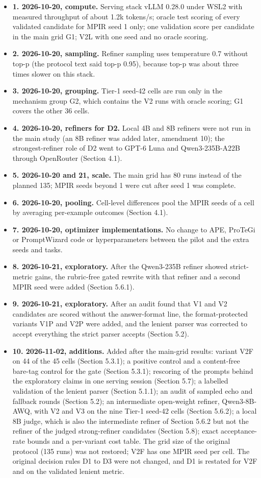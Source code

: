 \documentclass{ieeeaccess}
\begin{document}
\begin{itemize}
\item \textbf{1. 2026-10-20, compute.} Serving stack vLLM 0.28.0 under WSL2 with measured throughput of about 1.2k tokens/s; oracle test scoring of every validated candidate for MPIR seed 1 only; one validation score per candidate in the main grid G1; V2L with one seed and no oracle scoring.
\item \textbf{2. 2026-10-20, sampling.} Refiner sampling uses temperature 0.7 without top-p (the protocol text said top-p 0.95), because top-p was about three times slower on this stack.
\item \textbf{3. 2026-10-20, grouping.} Tier-1 seed-42 cells are run only in the mechanism group G2, which contains the V2 runs with oracle scoring; G1 covers the other 36 cells.
\item \textbf{4. 2026-10-20, refiners for D2.} Local 4B and 8B refiners were not run in the main study (an 8B refiner was added later, amendment 10); the strongest-refiner role of D2 went to GPT-6 Luna and Qwen3-235B-A22B through OpenRouter (Section 4.1).
\item \textbf{5. 2026-10-20 and 21, scale.} The main grid has 80 runs instead of the planned 135; MPIR seeds beyond 1 were cut after seed 1 was complete.
\item \textbf{6. 2026-10-20, pooling.} Cell-level differences pool the MPIR seeds of a cell by averaging per-example outcomes (Section 4.1).
\item \textbf{7. 2026-10-20, optimizer implementations.} No change to APE, ProTeGi or PromptWizard code or hyperparameters between the pilot and the extra seeds and tasks.
\item \textbf{8. 2026-10-21, exploratory.} After the Qwen3-235B refiner showed strict-metric gains, the rubric-free gated rewrite with that refiner and a second MPIR seed were added (Section 5.6.1).
\item \textbf{9. 2026-10-21, exploratory.} After an audit found that V1 and V2 candidates are scored without the answer-format line, the format-protected variants V1P and V2P were added, and the lenient parser was corrected to accept everything the strict parser accepts (Section 5.2).
\item \textbf{10. 2026-11-02, additions.} Added after the main-grid results: variant V2F on 44 of the 45 cells (Section 5.3.1); a positive control and a content-free bare-tag control for the gate (Section 5.3.1); rescoring of the prompts behind the exploratory claims in one serving session (Section 5.7); a labelled validation of the lenient parser (Section 5.1.1); an audit of sampled echo and fallback rounds (Section 5.2); an intermediate open-weight refiner, Qwen3-8B-AWQ, with V2 and V3 on the nine Tier-1 seed-42 cells (Section 5.6.2); a local 8B judge, which is also the intermediate refiner of Section 5.6.2 but not the refiner of the judged strong-refiner candidates (Section 5.8); exact acceptance-rate bounds and a per-variant cost table. The grid size of the original protocol (135 runs) was not restored; V2F has one MPIR seed per cell. The original decision rules D1 to D3 were not changed, and D1 is restated for V2F and on the validated lenient metric.

\end{itemize}
\end{document}
